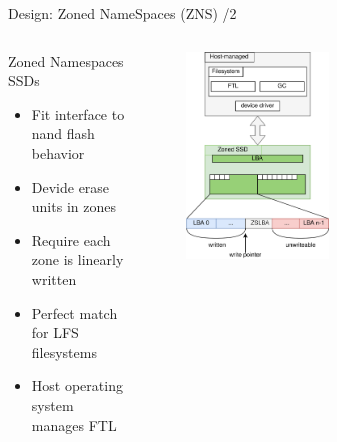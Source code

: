 \documentclass[aspectratio=169]{beamer}
\begin{document}
\begin{frame}{Design: Zoned NameSpaces (ZNS) /2}
    \begin{columns}
        \begin{column}{0.45\textwidth}
            \footnotesize
            Zoned Namespaces SSDs
            \begin{itemize}
                \item Fit interface to nand flash behavior
                \item Devide erase units in zones
                \item Require each zone is linearly written
                \item Perfect match for LFS filesystems
                \item Host operating system manages FTL
            \end{itemize}
        \end{column}
        \begin{column}{0.55\textwidth}
            \begingroup
            \small
            \begin{figure}
                \centering
                \includegraphics[width=0.5\textwidth]{resources/images/zns-lfs2.png}
            \end{figure}
            \endgroup
        \end{column}
    \end{columns}
\end{frame}
\end{document}
